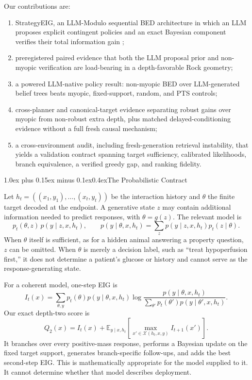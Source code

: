 \documentclass[10pt]{article}
\makeatletter
\renewcommand\section{\@startsection{section}{1}{0pt}%
  {1.0ex plus 0.15ex minus 0.1ex}{0.4ex}{\normalfont\Large\bfseries}}
\providecommand{\BongardContributionResult}{}
\makeatother
\begin{document}
Our contributions are:
\begin{enumerate}
  \setlength{\itemsep}{0.15em}
  \setlength{\topsep}{0.25em}
  \setlength{\parsep}{0pt}
  \item StrategyEIG, an LLM-Modulo sequential BED architecture in which an LLM
  proposes explicit contingent policies and an exact Bayesian component verifies
  their total information gain \citep{kambhampati2024llmmodulo};
  \item preregistered paired evidence that both the LLM proposal prior and
  non-myopic verification are load-bearing in a depth-favorable Rock geometry;
  \item a powered LLM-native policy result: non-myopic BED over LLM-generated
  belief trees beats myopic, fixed-support, random, and PTS controls;
  \item cross-planner and canonical-target evidence separating robust gains
  over myopic from non-robust extra depth, plus matched delayed-conditioning evidence
  without a full fresh causal mechanism;
  \BongardContributionResult
  \item a cross-environment audit, including fresh-generation retrieval
  instability, that yields a validation contract spanning target sufficiency,
  calibrated likelihoods, branch equivalence, a verified greedy gap, and ranking
  fidelity.
\end{enumerate}

\section{The Probabilistic Contract}

Let $h_t=((x_1,y_1),\ldots,(x_t,y_t))$ be the interaction history and
$\theta$ the finite target decoded at the endpoint. A generative state $z$ may
contain additional information needed to predict responses, with
$\theta=g(z)$. The relevant model is
\[
 p_t(\theta,z)\,p(y\mid z,x,h_t), \qquad
 p(y\mid\theta,x,h_t)=\sum_z p(y\mid z,x,h_t)p_t(z\mid\theta).
\]
When $\theta$ itself is sufficient, as for a hidden animal answering a property
question, $z$ can be omitted. When $\theta$ is merely a decision label, such as
``treat hypoperfusion first,'' it does not determine a patient's glucose or
history and cannot serve as the response-generating state.

For a coherent model, one-step EIG is
\[
 I_t(x)=\sum_{\theta,y}p_t(\theta)p(y\mid\theta,x,h_t)
 \log\frac{p(y\mid\theta,x,h_t)}{\sum_{\theta'}p_t(\theta')
 p(y\mid\theta',x,h_t)}.
\]
Our exact depth-two score is
\[
 Q_2(x)=I_t(x)+\mathbb E_{y\mid x,h_t}
 \left[\max_{x'\in\mathcal X(h_t,x,y)} I_{t+1}(x')\right].
\]
It branches over every positive-mass response, performs a Bayesian update on the
fixed target support, generates branch-specific follow-ups, and adds the best
second-step EIG. This is mathematically appropriate for the model supplied to it.
It cannot determine whether that model describes deployment.
\end{document}
